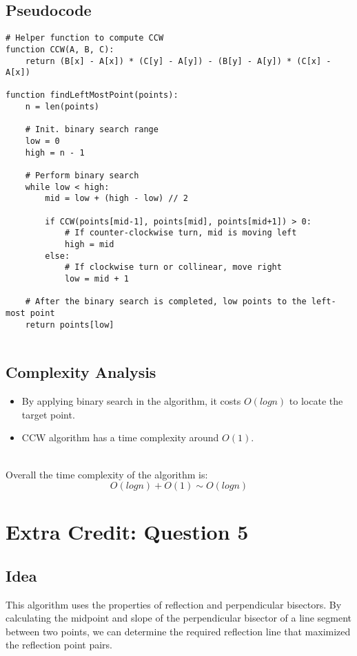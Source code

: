 \documentclass{article}
\begin{document}
\subsection*{Pseudocode}
\begin{verbatim}
# Helper function to compute CCW
function CCW(A, B, C):
    return (B[x] - A[x]) * (C[y] - A[y]) - (B[y] - A[y]) * (C[x] - A[x])

function findLeftMostPoint(points):
    n = len(points)

    # Init. binary search range
    low = 0
    high = n - 1

    # Perform binary search
    while low < high:
        mid = low + (high - low) // 2

        if CCW(points[mid-1], points[mid], points[mid+1]) > 0:
            # If counter-clockwise turn, mid is moving left
            high = mid
        else:
            # If clockwise turn or collinear, move right
            low = mid + 1

    # After the binary search is completed, low points to the left-most point
    return points[low]
  
\end{verbatim}

\subsection*{Complexity Analysis}
\begin{itemize}
    \item By applying binary search in the algorithm, it costs $O(logn)$ to locate the target point.
    \item CCW algorithm has a time complexity around $O(1)$.
\end{itemize}
\\
Overall the time complexity of the algorithm is:
\[ O(logn) + O(1) \sim O(logn) \]

\section*{Extra Credit: Question 5}

\subsection*{Idea}
This algorithm uses  the properties of reflection and perpendicular bisectors. By calculating the midpoint and slope of the perpendicular bisector of a line segment between two points, we can determine the required reflection line that maximized the reflection point pairs.
\end{document}
